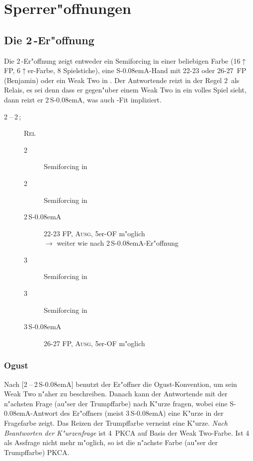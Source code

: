 \documentclass[11pt,german,twocolumn]{scrartcl}
\def\pik{\nobreak\,\Sp\xspace}
\def\coe{\nobreak\,\He\xspace}
\def\kar{\nobreak\,\Di\xspace}
\def\tre{\nobreak\,\Cl\xspace}
\def\ka{\Di\xspace}
\def\ra{$\rightarrow$\xspace}
\def\pl{$\uparrow$\xspace}
\def\ofa{\nobreak\textsf{OF}\xspace}
\def\sa{\nobreak\textsf{S\kern-0.08emA}\xspace}
\def\SA{\nobreak\,\sa}
\def\sep{\,--\,}
\def\bal{\textsc{Ausg}\xspace}
\def\rel{\textsc{Rel}\xspace}
\def\bdsc{\begin{description}}
\def\edsc{\end{description}}
\newcommand{\Index}[1]{#1\index{#1}}
\begin{document}
\newpage
\section{Sperrer"offnungen}

\subsection{Die 2\tre-Er"offnung}

Die 2\tre-Er"offnung zeigt entweder ein Semiforcing in einer beliebigen Farbe
(16\pl FP, 6\pl{}er-Farbe, 8 Spielstiche),
eine \sa-Hand mit 22-23 oder 26-27~FP (Benjamin) oder ein \Index{Weak Two} in \ka. Der
Antwortende reizt in der Regel 2\kar als Relais, es sei denn dass er gegen"uber
einem Weak Two in \ka ein volles Spiel sieht, dann reizt er 2\SA, was auch
\ka-Fit impliziert.

\bdsc
\item[2\tre{}\sep2\kar;] \rel
  \bdsc
  \item[2\coe] Semiforcing in \coe
  \item[2\pik] Semiforcing in \pik
  \item[2\SA] 22-23 FP, \bal, 5er-\ofa m"oglich \\
    \ra weiter wie nach 2\SA-Er"offnung
  \item[3\tre] Semiforcing in \tre
  \item[3\kar] Semiforcing in \kar
  \item[3\SA] 26-27 FP, \bal, 5er-\ofa m"oglich
  \edsc
\edsc

\subsubsection{Ogust} \label{ogust}

Nach [2\tre{}\sep2\SA] benutzt der Er"offner die Ogust-Konvention, um sein Weak
Two n"aher zu beschreiben. Danach kann der Antwortende mit der n"achsten Frage
(au"ser der Trumpffarbe) nach K"urze fragen, wobei eine \sa-Antwort des
Er"offners (meist 3\SA) eine K"urze in der Fragefarbe zeigt. Das Reizen der
Trumpffarbe verneint eine K"urze. \emph{Nach Beantworten der K"urzenfrage} ist
4\tre PKCA auf Basis der Weak Two-Farbe. Ist 4\tre als Assfrage nicht mehr
m"oglich, so ist die n"achste Farbe (au"ser der Trumpffarbe) PKCA.
\end{document}
